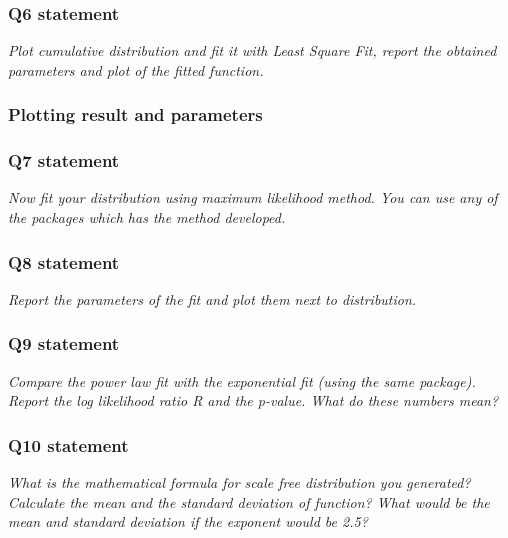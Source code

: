 \documentclass{article}
\begin{document}
\subsubsection{Q6 statement}
\textit{Plot cumulative distribution and fit it with Least Square Fit, report the obtained parameters and plot of the fitted function.}

\subsubsection*{Plotting result and parameters} 

\subsubsection{Q7 statement}
\textit{Now fit your distribution using maximum likelihood method. You can use any of the packages which has the method developed.}

\subsubsection{Q8 statement}
\textit{Report the parameters of the fit and plot them next to distribution.}

\subsubsection{Q9 statement}
\textit{Compare the power law fit with the exponential fit (using the same package). Report the log likelihood ratio R and the p-value. What do these numbers mean?}

\subsubsection{Q10 statement}
\textit{What is the mathematical formula for scale free distribution you generated? Calculate the mean and the standard deviation of function? What would be the mean and standard deviation if the exponent would be 2.5?}
\end{document}
